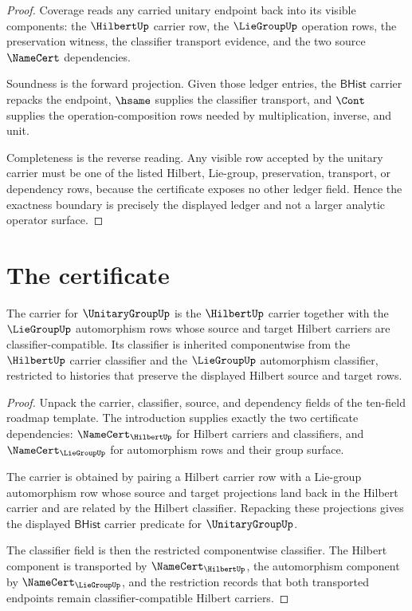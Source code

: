 \begin{proof}
Coverage reads any carried unitary endpoint back into its visible components: the $\HilbertUp$ carrier row, the $\LieGroupUp$ operation rows, the preservation witness, the classifier transport evidence, and the two source $\NameCert$ dependencies.

Soundness is the forward projection. Given those ledger entries, the $\mathsf{BHist}$ carrier repacks the endpoint, $\hsame$ supplies the classifier transport, and $\Cont$ supplies the operation-composition rows needed by multiplication, inverse, and unit.

Completeness is the reverse reading. Any visible row accepted by the unitary carrier must be one of the listed Hilbert, Lie-group, preservation, transport, or dependency rows, because the certificate exposes no other ledger field. Hence the exactness boundary is precisely the displayed ledger and not a larger analytic operator surface.
\end{proof}

\section{The certificate}
\label{sec:unitarygroup-certificate}

\begin{theorem}\label{thm:unitarygroup-carrier-classifier-obligation}
The carrier for $\UnitaryGroupUp$ is the $\HilbertUp$ carrier together with the $\LieGroupUp$ automorphism rows whose source and target Hilbert carriers are classifier-compatible. Its classifier is inherited componentwise from the $\HilbertUp$ carrier classifier and the $\LieGroupUp$ automorphism classifier, restricted to histories that preserve the displayed Hilbert source and target rows.
\end{theorem}
\begin{proof}
Unpack the carrier, classifier, source, and dependency fields of the ten-field roadmap template. The introduction supplies exactly the two certificate dependencies: $\NameCert_{\HilbertUp}$ for Hilbert carriers and classifiers, and $\NameCert_{\LieGroupUp}$ for automorphism rows and their group surface.

The carrier is obtained by pairing a Hilbert carrier row with a Lie-group automorphism row whose source and target projections land back in the Hilbert carrier and are related by the Hilbert classifier. Repacking these projections gives the displayed $\mathsf{BHist}$ carrier predicate for $\UnitaryGroupUp$.

The classifier field is then the restricted componentwise classifier. The Hilbert component is transported by $\NameCert_{\HilbertUp}$, the automorphism component by $\NameCert_{\LieGroupUp}$, and the restriction records that both transported endpoints remain classifier-compatible Hilbert carriers.
\end{proof}

